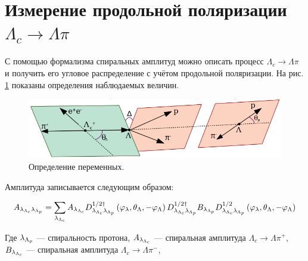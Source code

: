 \section{Измерение продольной поляризации $\Lambda_c \to \Lambda \pi$}

С помощью формализма спиральных амплитуд \textbf{\cite{Richman}} можно описать процесс 
$\Lambda_c \to \Lambda \pi$ и получить его угловое распределение с 
учётом продольной поляризации. На рис. \ref{def:val} показаны определения 
наблюдаемых величин. 

\begin{figure}[H]
    \centering
    \includegraphics[width=0.7\linewidth]{img/lpi_def.png}
    \caption{Определение переменных.}
    \label{def:val}
\end{figure}

Амплитуда записывается следующим образом:

\begin{equation}
    A_{\lambda_{\Lambda_{c}} \lambda_{\Lambda_{p}}} = \sum_{\lambda_{\Lambda_{c}}} A_{\lambda_{\Lambda_{c}}} D^{1/2\dag}_{\lambda_{\Lambda_{c}} \lambda_{\Lambda_{p}}}\left(\varphi_\lambda, \theta_\Lambda, -\varphi_\Lambda \right) D^{1/2\dag}_{\lambda_{\Lambda_{c}} \lambda_{\Lambda_{p}}} B_{\lambda_{\Lambda_{p}}} D^{1/2}_{\lambda_{\Lambda_{c}} \lambda_{\Lambda_{p}}}\left(\varphi_\lambda, \theta_\Lambda, -\varphi_\Lambda \right)
\end{equation}

Где $\lambda_{\Lambda_{p}}$ --- спиральность протона, 
$A_{\lambda_{\Lambda_{c}}}$ --- спиральная амплитуда $\Lambda_c \to \Lambda \pi^+$, 
$B_{\lambda_{\Lambda_{c}}}$ --- спиральная амплитуда $\Lambda_c \to \Lambda \pi^-$,




